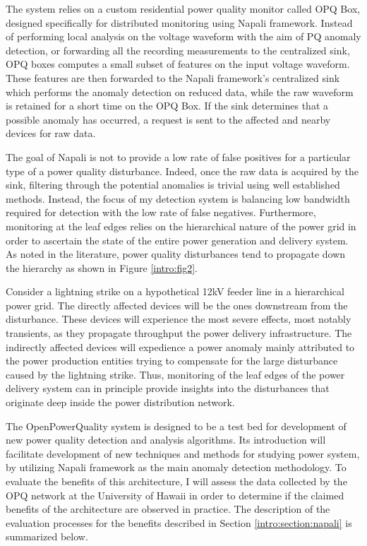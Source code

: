 The system relies on a custom residential power quality monitor called OPQ Box, designed specifically for distributed monitoring using Napali framework. Instead of performing local analysis on the voltage waveform with the aim of PQ anomaly detection, or forwarding all the recording measurements to the centralized sink, OPQ boxes computes a small subset of features on the input voltage waveform. These features are then forwarded to the Napali framework's centralized sink which performs the anomaly detection on reduced data, while the raw waveform is retained for a short time on the OPQ Box. If the sink determines that a possible anomaly has occurred, a request is sent to the affected and nearby devices for raw data.

The goal of Napali is not to provide a low rate of false positives for a particular type of a power quality disturbance. Indeed, once the raw data is acquired by the sink, filtering through the potential anomalies is trivial using well established methods. Instead, the focus of my detection system is balancing low bandwidth required for detection with the low rate of false negatives. Furthermore, monitoring at the leaf edges relies on the hierarchical nature of the power grid in order to ascertain the state of the entire power generation and delivery system. As noted in the literature, power quality disturbances tend to propagate down the hierarchy as shown in Figure \ref{intro:fig2}. 

Consider a lightning strike on a hypothetical 12kV feeder line in a hierarchical power grid. The directly affected devices will be the ones downstream from the disturbance. These devices will experience the most severe effects, most notably transients, as they propagate throughput the power delivery infrastructure. The indirectly affected devices will expedience a power anomaly mainly attributed to the power production entities trying to compensate for the large disturbance caused by the lightning strike. Thus, monitoring of the leaf edges of the power delivery system can in principle provide insights into the disturbances that originate deep inside the power distribution network.

The OpenPowerQuality system is designed to be a test bed for development of new power quality detection and analysis algorithms. Its introduction will facilitate development of new techniques and methods for studying power system, by utilizing Napali framework as the main anomaly detection methodology. To evaluate the benefits of this architecture, I will assess the data collected by the OPQ network at the University of Hawaii in order to determine if the claimed benefits of the architecture are observed in practice. The description of the evaluation processes for the benefits described in Section \ref{intro:section:napali} is summarized below.

